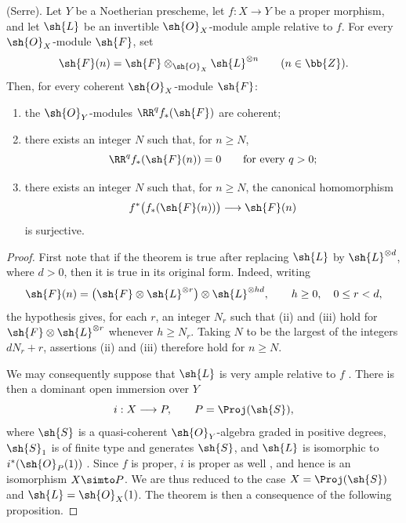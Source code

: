 \begin{theorem}[2.2.1]
\label{III.2.2.1}
(Serre).
Let $Y$ be a Noetherian prescheme, let $f:X\to Y$ be a proper morphism, and let $\sh{L}$ be an invertible $\sh{O}_X$-module ample relative to $f$.
For every $\sh{O}_X$-module $\sh{F}$, set
\[
  \sh{F}(n)=\sh{F}\otimes_{\sh{O}_X}\sh{L}^{\otimes n}
  \qquad(n\in\bb{Z}).
\]
Then, for every coherent $\sh{O}_X$-module $\sh{F}$:
\begin{enumerate}
  \item[{\rm(i)}] the $\sh{O}_Y$-modules $\RR^qf_*(\sh{F})$ are coherent;
  \item[{\rm(ii)}] there exists an integer $N$ such that, for $n\geq N$,
  \[
    \RR^qf_*(\sh{F}(n))=0
    \qquad\text{for every }q>0;
  \]
  \item[{\rm(iii)}] there exists an integer $N$ such that, for $n\geq N$, the canonical homomorphism
  \[
    f^*\bigl(f_*(\sh{F}(n))\bigr)\longrightarrow\sh{F}(n)
  \]
  is surjective.
\end{enumerate}
\end{theorem}

\begin{proof}
First note that if the theorem is true after replacing $\sh{L}$ by $\sh{L}^{\otimes d}$, where $d>0$, then it is true in its original form.
Indeed, writing
\[
  \sh{F}(n)
  =\bigl(\sh{F}\otimes\sh{L}^{\otimes r}\bigr)
   \otimes\sh{L}^{\otimes hd},
  \qquad h\geq0,\quad 0\leq r<d,
\]
the hypothesis gives, for each $r$, an integer $N_r$ such that (ii) and (iii) hold for $\sh{F}\otimes\sh{L}^{\otimes r}$ whenever $h\geq N_r$.
Taking $N$ to be the largest of the integers $dN_r+r$, assertions (ii) and (iii) therefore hold for $n\geq N$.

We may consequently suppose that $\sh{L}$ is very ample relative to $f$ .
There is then a dominant open immersion over $Y$
\[
  i:X\longrightarrow P,
  \qquad P=\Proj(\sh{S}),
\]
where $\sh{S}$ is a quasi-coherent $\sh{O}_Y$-algebra graded in positive degrees, $\sh{S}_1$ is of finite type and generates $\sh{S}$, and $\sh{L}$ is isomorphic to $i^*(\sh{O}_P(1))$ .
Since $f$ is proper, $i$ is proper as well , and hence is an isomorphism $X\simto P$.
We are thus reduced to the case $X=\Proj(\sh{S})$ and $\sh{L}=\sh{O}_X(1)$.
The theorem is then a consequence of the following proposition.
\end{proof}

